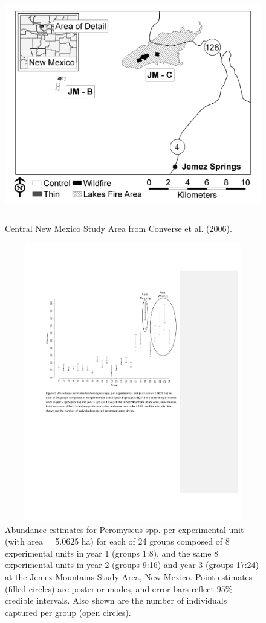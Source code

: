 \begin{figure}[ht]
\begin{center}
\includegraphics[height=4in,width=5.2in]{Ch14-Multisession/figs/converse_NM_Overview_4.jpg}
\end{center}
\caption{
Central New Mexico Study Area from Converse et al. (2006).
}
\label{fig.studyarea}
\end{figure}



\begin{figure}[ht]
\begin{center}
\includegraphics[height=4.8in,width=6.5in]{Ch14-Multisession/figs/figure_V2.pdf}
\end{center}
\caption{
Abundance estimates for Peromyscus spp. per experimental unit
(with area = 5.0625 ha) for each of 24 groups composed of 8
experimental units in year 1 (groups 1:8), and the same 8
experimental units in year 2 (groups 9:16) and year 3 (groups 17:24)
at the Jemez Mountains Study Area, New Mexico.  Point estimates
(filled circles) are posterior modes, and error bars reflect 95\%
credible intervals. Also shown are the number of individuals
captured per group (open circles).  }
\label{fig.fig1}
\end{figure}


